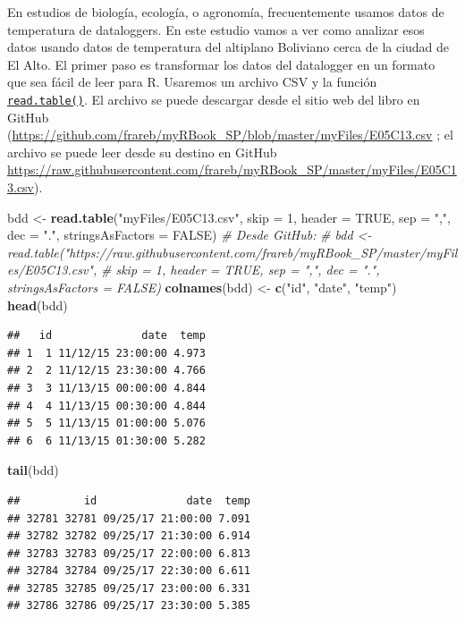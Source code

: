 \documentclass[
]{book}
\newenvironment{Shaded}{\begin{snugshade}}{\end{snugshade}}
\newcommand{\CommentTok}[1]{\textcolor[rgb]{0.56,0.35,0.01}{\textit{#1}}}
\newcommand{\DataTypeTok}[1]{\textcolor[rgb]{0.13,0.29,0.53}{#1}}
\newcommand{\DecValTok}[1]{\textcolor[rgb]{0.00,0.00,0.81}{#1}}
\newcommand{\KeywordTok}[1]{\textcolor[rgb]{0.13,0.29,0.53}{\textbf{#1}}}
\newcommand{\NormalTok}[1]{#1}
\newcommand{\OtherTok}[1]{\textcolor[rgb]{0.56,0.35,0.01}{#1}}
\newcommand{\StringTok}[1]{\textcolor[rgb]{0.31,0.60,0.02}{#1}}
\begin{document}
En estudios de biología, ecología, o agronomía, frecuentemente usamos datos de temperatura de dataloggers. En este estudio vamos a ver como analizar esos datos usando datos de temperatura del altiplano Boliviano cerca de la ciudad de El Alto. El primer paso es transformar los datos del datalogger en un formato que sea fácil de leer para R. Usaremos un archivo CSV y la función \protect\hyperlink{import}{\texttt{read.table()}}. El archivo se puede descargar desde el sitio web del libro en GitHub (\url{https://github.com/frareb/myRBook_SP/blob/master/myFiles/E05C13.csv} ; el archivo se puede leer desde su destino en GitHub \url{https://raw.githubusercontent.com/frareb/myRBook_SP/master/myFiles/E05C13.csv}).

\begin{Shaded}
\begin{Highlighting}[]
\NormalTok{bdd <-}\StringTok{ }\KeywordTok{read.table}\NormalTok{(}\StringTok{"myFiles/E05C13.csv"}\NormalTok{, }\DataTypeTok{skip =} \DecValTok{1}\NormalTok{, }\DataTypeTok{header =} \OtherTok{TRUE}\NormalTok{, }
  \DataTypeTok{sep =} \StringTok{","}\NormalTok{, }\DataTypeTok{dec =} \StringTok{"."}\NormalTok{, }\DataTypeTok{stringsAsFactors =} \OtherTok{FALSE}\NormalTok{)}
\CommentTok{# Desde GitHub: }
\CommentTok{# bdd <- read.table("https://raw.githubusercontent.com/frareb/myRBook_SP/master/myFiles/E05C13.csv", }
\CommentTok{#   skip = 1, header = TRUE, sep = ",", dec = ".", stringsAsFactors = FALSE)}
\KeywordTok{colnames}\NormalTok{(bdd) <-}\StringTok{ }\KeywordTok{c}\NormalTok{(}\StringTok{"id"}\NormalTok{, }\StringTok{"date"}\NormalTok{, }\StringTok{"temp"}\NormalTok{)}
\KeywordTok{head}\NormalTok{(bdd)}
\end{Highlighting}
\end{Shaded}

\begin{verbatim}
##   id              date  temp
## 1  1 11/12/15 23:00:00 4.973
## 2  2 11/12/15 23:30:00 4.766
## 3  3 11/13/15 00:00:00 4.844
## 4  4 11/13/15 00:30:00 4.844
## 5  5 11/13/15 01:00:00 5.076
## 6  6 11/13/15 01:30:00 5.282
\end{verbatim}

\begin{Shaded}
\begin{Highlighting}[]
\KeywordTok{tail}\NormalTok{(bdd)}
\end{Highlighting}
\end{Shaded}

\begin{verbatim}
##          id              date  temp
## 32781 32781 09/25/17 21:00:00 7.091
## 32782 32782 09/25/17 21:30:00 6.914
## 32783 32783 09/25/17 22:00:00 6.813
## 32784 32784 09/25/17 22:30:00 6.611
## 32785 32785 09/25/17 23:00:00 6.331
## 32786 32786 09/25/17 23:30:00 5.385
\end{verbatim}
\end{document}
